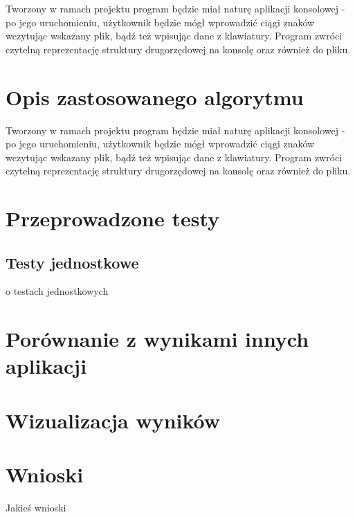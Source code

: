 \documentclass[paper=a4, fontsize=11pt]{scrartcl} %
\numberwithin{equation}{section} %
\numberwithin{figure}{section} %
\numberwithin{table}{section} %
\begin{document}
Tworzony w ramach projektu program będzie miał naturę aplikacji konsolowej - po jego uruchomieniu, użytkownik będzie mógł wprowadzić ciągi znaków wczytując wskazany plik, bądź też wpisując dane z klawiatury. 
Program zwróci czytelną reprezentację struktury drugorzędowej na konsolę oraz również do pliku.


\section{Opis zastosowanego algorytmu}

Tworzony w ramach projektu program będzie miał naturę aplikacji konsolowej - po jego uruchomieniu, użytkownik będzie mógł wprowadzić ciągi znaków wczytując wskazany plik, bądź też wpisując dane z klawiatury. 
Program zwróci czytelną reprezentację struktury drugorzędowej na konsolę oraz również do pliku.



\section{Przeprowadzone testy}

\subsection{Testy jednostkowe}
o testach jednostkowych 

 

\section{Porównanie z wynikami innych aplikacji}

 

\section{Wizualizacja wyników}

\section{Wnioski}

Jakieś wnioski

\renewcommand{\refname}{\normalfont\selectfont\normalsize Literatura i źródła} 



\end{document}

